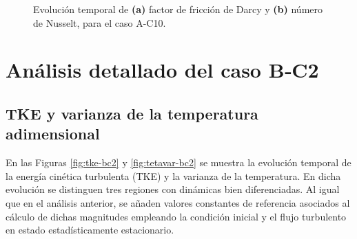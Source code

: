 \begin{figure}[H]
  \centering  
    
  \caption{Evolución temporal de \textbf{(a)} factor de fricción de Darcy y \textbf{(b)} número de Nusselt, para el caso A-C10.}
  \label{fig:ac10-1}
\end{figure}



\newpage
\section{Análisis detallado del caso B‑C2} \label{sec:bc2}

\subsection{TKE y varianza de la temperatura adimensional}
En las Figuras \ref{fig:tke-bc2} y \ref{fig:tetavar-bc2} se muestra la evolución temporal de la energía cinética turbulenta (TKE) y la varianza de la temperatura. En dicha evolución se distinguen tres regiones con dinámicas bien diferenciadas. Al igual que en el análisis anterior, se añaden valores constantes de referencia asociados al cálculo de dichas magnitudes empleando la condición inicial y el flujo turbulento en estado estadísticamente estacionario. 

